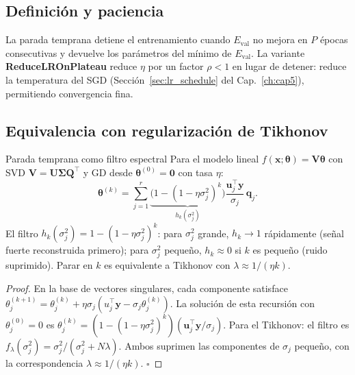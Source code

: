 
\subsection{Definición y paciencia}
\label{subsec:early_def}

La parada temprana detiene el entrenamiento cuando $E_{\text{val}}$ no
mejora en $P$ épocas consecutivas y devuelve los parámetros del mínimo de
$E_{\text{val}}$. La variante \textbf{ReduceLROnPlateau} reduce $\eta$
por un factor $\rho < 1$ en lugar de detener: reduce la temperatura del
SGD (Sección~\ref{sec:lr_schedule} del Cap.~\ref{ch:cap5}), permitiendo
convergencia fina.

\subsection{Equivalencia con regularización de Tikhonov}
\label{subsec:early_tikhonov}

\begin{proposicion}{Parada temprana como filtro espectral}
\label{prop:early_svd}
Para el modelo lineal $f(\bm{x};\bm{\theta}) = \bm{V}\bm{\theta}$ con
SVD $\bm{V} = \bm{U}\bm{\Sigma}\bm{Q}^\top$ y GD desde
$\bm{\theta}^{(0)} = \bm{0}$ con tasa $\eta$:
\begin{equation}
  \bm{\theta}^{(k)} = \sum_{j=1}^r
  \underbrace{\bigl(1-(1-\eta\sigma_j^2)^k\bigr)}_{h_k(\sigma_j^2)}
  \frac{\bm{u}_j^\top\bm{y}}{\sigma_j}\,\bm{q}_j.
  \label{eq:early_filtro}
\end{equation}
El filtro $h_k(\sigma_j^2) = 1-(1-\eta\sigma_j^2)^k$:
para $\sigma_j^2$ grande, $h_k \to 1$ rápidamente (señal fuerte
reconstruida primero); para $\sigma_j^2$ pequeño, $h_k \approx 0$ si
$k$ es pequeño (ruido suprimido). Parar en $k$ es equivalente a Tikhonov
con $\lambda \approx 1/(\eta k)$.
\end{proposicion}

\begin{proof}
En la base de vectores singulares, cada componente satisface
$\theta_j^{(k+1)} = \theta_j^{(k)} + \eta\sigma_j(u_j^\top\bm{y}
- \sigma_j\theta_j^{(k)})$. La solución de esta recursión con
$\theta_j^{(0)} = 0$ es
$\theta_j^{(k)} = (1-(1-\eta\sigma_j^2)^k)
(\bm{u}_j^\top\bm{y}/\sigma_j)$. Para el Tikhonov: el filtro es
$f_\lambda(\sigma_j^2) = \sigma_j^2/(\sigma_j^2+N\lambda)$. Ambos
suprimen las componentes de $\sigma_j$ pequeño, con la correspondencia
$\lambda \approx 1/(\eta k)$. $\square$
\end{proof}

